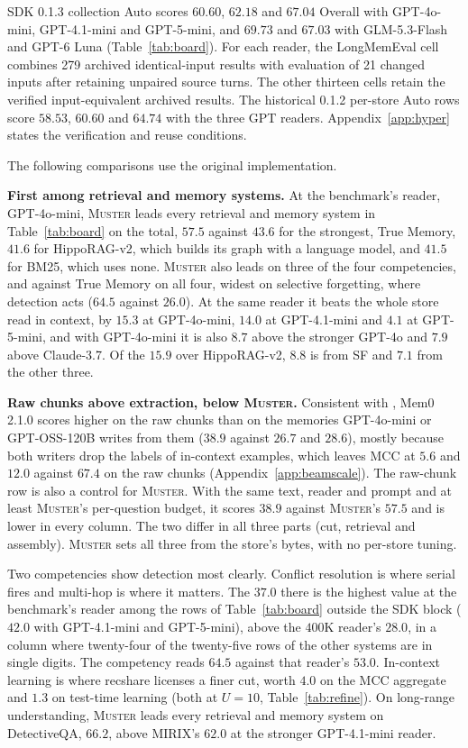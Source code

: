 \documentclass{article}
\newcommand{\sys}{\textsc{Muster}}
\newcommand{\serial}{\textsf{serial}}
\newcommand{\cov}{\textsf{recshare}}
\begin{document}
SDK 0.1.3 collection Auto scores $60.60$, $62.18$ and $67.04$ Overall with GPT-4o-mini, GPT-4.1-mini and GPT-5-mini, and $69.73$ and $67.03$ with GLM-5.3-Flash and GPT-6 Luna (Table~\ref{tab:board}). For each reader, the LongMemEval cell combines 279 archived identical-input results with evaluation of 21 changed inputs after retaining unpaired source turns. The other thirteen cells retain the verified input-equivalent archived results. The historical 0.1.2 per-store Auto rows score $58.53$, $60.60$ and $64.74$ with the three GPT readers. Appendix~\ref{app:hyper} states the verification and reuse conditions.

The following comparisons use the original implementation.

\textbf{First among retrieval and memory systems.} At the benchmark's reader, GPT-4o-mini, \sys{} leads every retrieval and memory system in
Table~\ref{tab:board} on the total, $57.5$ against $43.6$ for the strongest, True Memory, $41.6$ for HippoRAG-v2, which builds its graph with a language model, and $41.5$ for BM25, which uses none. \sys{} also leads on three of the four competencies, and against True Memory on all four, widest on selective forgetting, where detection acts ($64.5$ against $26.0$). At the
same reader it beats the whole store read in context, by $15.3$ at GPT-4o-mini, $14.0$ at GPT-4.1-mini and
$4.1$ at GPT-5-mini, and with GPT-4o-mini it is also $8.7$ above the stronger GPT-4o and $7.9$ above Claude-3.7. Of the $15.9$ over HippoRAG-v2, $8.8$ is from SF and $7.1$ from the other three.

\textbf{Raw chunks above extraction, below \sys{}.} Consistent with \cite{fidelity}, Mem0 2.1.0 scores higher on the raw chunks than on the memories GPT-4o-mini or GPT-OSS-120B writes from them ($38.9$ against $26.7$ and $28.6$), mostly because both writers drop the labels of in-context examples, which leaves MCC at $5.6$ and $12.0$ against $67.4$ on the raw chunks (Appendix~\ref{app:beamscale}). The raw-chunk row is also a control for \sys{}. With the same text, reader and prompt and at least \sys{}'s per-question budget, it scores $38.9$ against \sys{}'s $57.5$ and is lower in every column. The two differ in all three parts (cut, retrieval and assembly). \sys{} sets all three from the store's bytes, with no per-store tuning.

Two competencies show detection most clearly. Conflict resolution is where \serial{} fires and
multi-hop is where it matters. The $37.0$ there is the highest value at the benchmark's reader among the rows of Table~\ref{tab:board} outside the SDK block ($42.0$ with GPT-4.1-mini and GPT-5-mini), above the
$400$K reader's $28.0$, in a column where twenty-four of the twenty-five rows of the other systems are in single digits.
The competency reads $64.5$ against that reader's $53.0$.
In-context learning is where \cov{} licenses a finer cut, worth $4.0$ on the MCC aggregate and $1.3$ on test-time learning (both at $U=10$, Table~\ref{tab:refine}). On long-range understanding, \sys{} leads every retrieval and memory system on DetectiveQA, $66.2$, above MIRIX's $62.0$ at the stronger GPT-4.1-mini reader.
\end{document}
